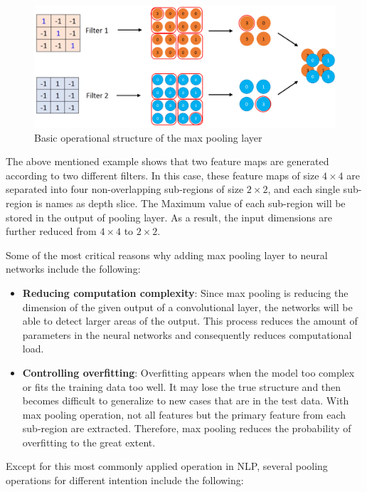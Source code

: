 \documentclass[]{krantz}
\providecommand{\tightlist}{%
  \setlength{\itemsep}{0pt}\setlength{\parskip}{0pt}}
\begin{document}
\begin{figure}[ht]

{\centering \includegraphics[width=0.8\linewidth]{figures/01-03-cnns-and-their-applications-in-nlp/Max_Pooling_finish} 

}

\caption{Basic operational structure of the max pooling layer }\label{fig:figs-5}
\end{figure}

The above mentioned example shows that two feature maps are generated according to two different filters. In this case, these feature maps of size \(4\times4\) are separated into four non-overlapping sub-regions of size \(2\times2\), and each single sub-region is names as depth slice. The Maximum value of each sub-region will be stored in the output of pooling layer. As a result, the input dimensions are further reduced from \(4\times4\) to \(2\times2\).

Some of the most critical reasons why adding max pooling layer to neural networks include the following:

\begin{itemize}
\tightlist
\item
  \textbf{Reducing computation complexity}: Since max pooling is reducing the dimension of the given output of a convolutional layer, the networks will be able to detect larger areas of the output. This process reduces the amount of parameters in the neural networks and consequently reduces computational load.
\item
  \textbf{Controlling overfitting}: Overfitting appears when the model too complex or fits the training data too well. It may lose the true structure and then becomes difficult to generalize to new cases that are in the test data. With max pooling operation, not all features but the primary feature from each sub-region are extracted. Therefore, max pooling reduces the probability of overfitting to the great extent.
\end{itemize}

Except for this most commonly applied operation in NLP, several pooling operations for different intention include the following:
\end{document}
